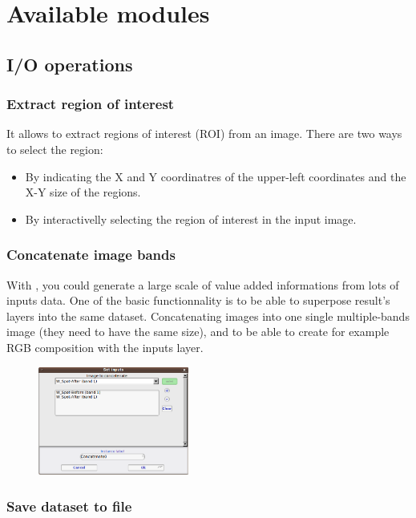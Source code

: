 \section{Available modules}\label{sec:modules} 
\subsection{I/O operations}
\subsubsection{Extract region of interest}
It allows to extract regions of interest (ROI) from an image. There are two ways to select the region:
\begin{itemize}
\item By indicating the X and Y coordinatres of the upper-left coordinates and the X-Y size of the regions.
\item By interactivelly selecting the region of interest in the input image.
\end{itemize}

\subsubsection{Concatenate image bands}
With \mont, you could generate a large scale of value added
informations from lots of inputs data. One of the basic functionnality
is to be able to superpose result's layers into the same dataset.
Concatenating images into one single multiple-bands image (they need
to have the same size), and to be able to create for example RGB
composition with the inputs layer.

\begin{figure}
  \center
  \includegraphics[width=0.44\textwidth]{../Art/MonteverdiImages/monteverdi_concatenate_before_after.png}
  \label{fig:concatenate}
\end{figure}

\subsubsection{Save dataset to file}

